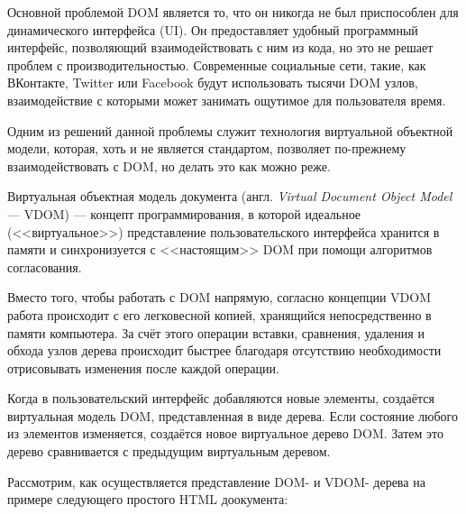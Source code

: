 Основной проблемой DOM является то, что он никогда не был приспособлен для динамического интерфейса (UI). 
Он предоставляет удобный программный интерфейс, позволяющий взаимодействовать с ним из кода, но это не решает проблем с производительностью.
Современные социальные сети, такие, как ВКонтакте, Twitter или Facebook будут использовать тысячи DOM узлов, взаимодействие с которыми может занимать ощутимое для пользователя время.

Одним из решений данной проблемы служит технология виртуальной объектной модели, которая, хоть  и не является стандартом, позволяет по-прежнему взаимодействовать с DOM, но делать это как можно реже.

Виртуальная объектная модель документа (англ. \textit{Virtual Document Object Model} --- VDOM) \cite{vdom} ---  концепт программирования, в которой идеальное (<<виртуальное>>) представление пользовательского интерфейса хранится в памяти и синхронизуется с <<настоящим>> DOM при помощи алгоритмов согласования.

Вместо того, чтобы работать с DOM напрямую, согласно концепции VDOM работа происходит с его легковесной копией, хранящийся непосредственно в памяти компьютера. 
За счёт этого операции вставки, сравнения, удаления и обхода узлов дерева происходит быстрее благодаря отсутствию необходимости отрисовывать изменения после каждой операции.

Когда в пользовательский интерфейс добавляются новые элементы, создаётся виртуальная модель DOM, представленная в виде дерева. 
Если состояние любого из элементов изменяется, создаётся новое виртуальное дерево DOM. 
Затем это дерево сравнивается с предыдущим виртуальным деревом.


Рассмотрим, как осуществляется представление DOM- и VDOM- дерева на примере следующего простого HTML доокумента:
\clearpage
{}
 

